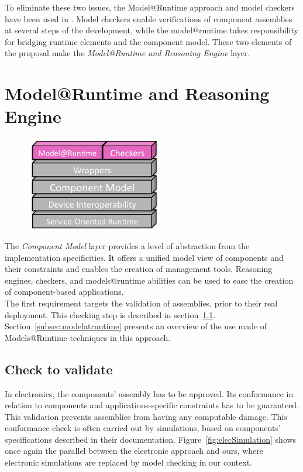To eliminate these two issues, the Model@Runtime approach and model checkers have been used in \enti{}. Model checkers enable verifications of component assemblies at several steps of the development, while the model@runtime takes responsibility for bridging runtime elements and the component model. These two elements of the proposal make the {\it Model@Runtime and Reasoning Engine} layer.\\


\section{Model@Runtime and Reasoning Engine}
\label{sec:martAndReasoning}

\begin{figure}
  \vspace{-5mm}
  \includegraphics[width=60mm]{part2/pics/layers/MartReasoners.pdf}
  \vspace{-5mm}
\end{figure}

The {\it Component Model} layer provides a level of abstraction from the implementation specificities. It offers a unified model view of components and their constraints and enables the creation of management tools. Reasoning engines, checkers, and models@runtime abilities can be used to ease the creation of component-based applications.\\
The first requirement targets the validation of assemblies, prior to their real deployment. This checking step is described in section~\ref{subsec:check_to_validate}. Section~\ref{subsec:modelatruntime} presents an overview of the use made of Models@Runtime techniques in this approach.


\subsection{Check to validate}
\label{subsec:check_to_validate}

In electronics, the components' assembly has to be approved. Its conformance in relation to components and applications-specific constraints has to be guaranteed. This validation prevents assemblies from having any computable damage. This conformance check is often carried out by simulations, based on components' specifications described in their documentation. Figure~\ref{fig:elecSimulation} shows once again the parallel between the electronic approach and ours, where electronic simulations are replaced by model checking in our context.\\

